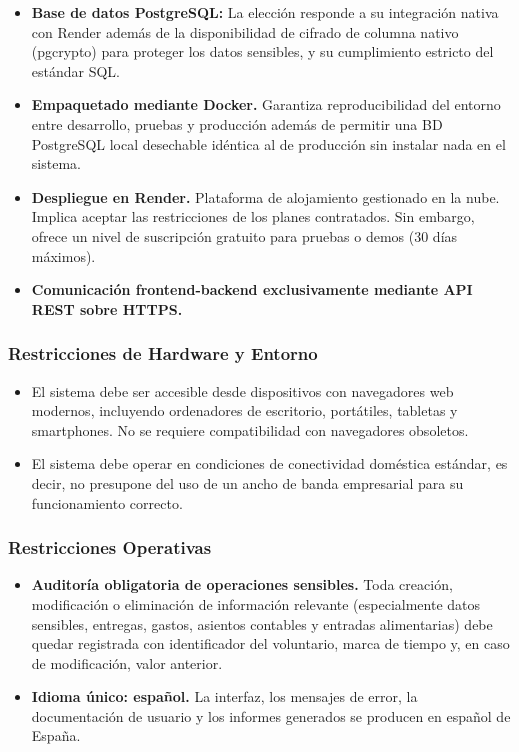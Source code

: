 \begin{itemize}
    \item \textbf{Base de datos PostgreSQL:} La elección responde a su integración nativa con Render además de 
    la disponibilidad de cifrado de columna nativo (pgcrypto) para proteger los datos sensibles, y su
    cumplimiento estricto del estándar SQL\@.

    \item \textbf{Empaquetado mediante Docker.} Garantiza reproducibilidad del entorno entre desarrollo, 
    pruebas y producción además de permitir una BD PostgreSQL local desechable idéntica al de producción sin instalar nada en el sistema.

    \item \textbf{Despliegue en Render.} Plataforma de alojamiento gestionado en la
    nube. Implica aceptar las restricciones de los planes contratados. Sin embargo, ofrece 
    un nivel de suscripción gratuito para pruebas o demos (30 días máximos). 

    \item \textbf{Comunicación frontend-backend exclusivamente mediante API REST sobre HTTPS.}
\end{itemize}


\subsubsection{Restricciones de Hardware y Entorno}
\begin{itemize}
    \item El sistema debe ser accesible desde dispositivos con navegadores web modernos, incluyendo 
    ordenadores de escritorio, portátiles, tabletas y smartphones. No se requiere compatibilidad con 
    navegadores obsoletos.
    \item El sistema debe operar en condiciones de conectividad doméstica
    estándar, es decir, no presupone del uso de un ancho de banda empresarial para su funcionamiento correcto.
\end{itemize}


\subsubsection{Restricciones Operativas}
\begin{itemize}
    \item \textbf{Auditoría obligatoria de operaciones sensibles.} Toda creación,
    modificación o eliminación de información relevante (especialmente datos
    sensibles, entregas, gastos, asientos contables y entradas alimentarias)
    debe quedar registrada con identificador del voluntario, marca de
    tiempo y, en caso de modificación, valor anterior.

    \item \textbf{Idioma único: español.} La interfaz, los mensajes de error, la
    documentación de usuario y los informes generados se producen en español de España.
\end{itemize}



